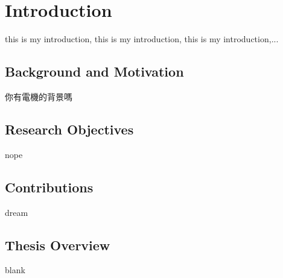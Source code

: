 
\chapter{Introduction}

this is my introduction, this is my introduction, this is my introduction,...

\section{Background and Motivation}

你有電機的背景嗎

\section{Research Objectives}

nope

\section{Contributions}

dream

\section{Thesis Overview}

blank